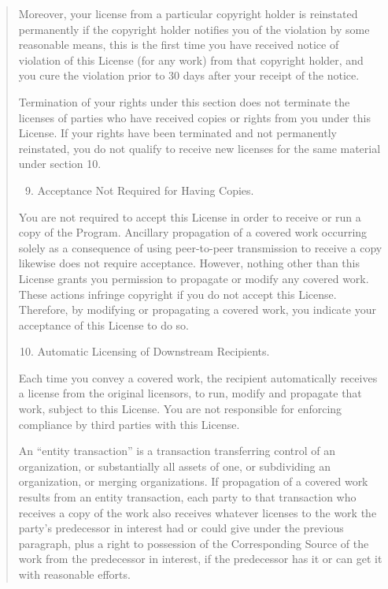 \documentclass[letterpaper,10pt,english]{sphinxmanual}
\begin{document}
\begin{quote}
Moreover, your license from a particular copyright holder is
reinstated permanently if the copyright holder notifies you of the
violation by some reasonable means, this is the first time you have
received notice of violation of this License (for any work) from that
copyright holder, and you cure the violation prior to 30 days after
your receipt of the notice.

Termination of your rights under this section does not terminate the
licenses of parties who have received copies or rights from you under
this License.  If your rights have been terminated and not permanently
reinstated, you do not qualify to receive new licenses for the same
material under section 10.
\begin{enumerate}
\setcounter{enumi}{8}
\item {} 
Acceptance Not Required for Having Copies.

\end{enumerate}

You are not required to accept this License in order to receive or
run a copy of the Program.  Ancillary propagation of a covered work
occurring solely as a consequence of using peer-to-peer transmission
to receive a copy likewise does not require acceptance.  However,
nothing other than this License grants you permission to propagate or
modify any covered work.  These actions infringe copyright if you do
not accept this License.  Therefore, by modifying or propagating a
covered work, you indicate your acceptance of this License to do so.
\begin{enumerate}
\setcounter{enumi}{9}
\item {} 
Automatic Licensing of Downstream Recipients.

\end{enumerate}

Each time you convey a covered work, the recipient automatically
receives a license from the original licensors, to run, modify and
propagate that work, subject to this License.  You are not responsible
for enforcing compliance by third parties with this License.

An ``entity transaction'' is a transaction transferring control of an
organization, or substantially all assets of one, or subdividing an
organization, or merging organizations.  If propagation of a covered
work results from an entity transaction, each party to that
transaction who receives a copy of the work also receives whatever
licenses to the work the party's predecessor in interest had or could
give under the previous paragraph, plus a right to possession of the
Corresponding Source of the work from the predecessor in interest, if
the predecessor has it or can get it with reasonable efforts.


\end{quote}
\end{document}
